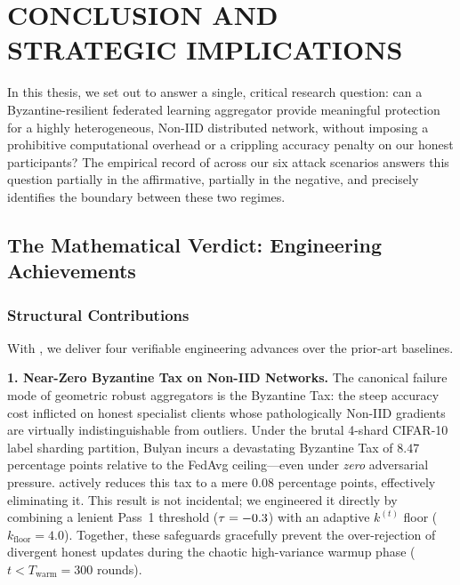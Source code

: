 \documentclass[../main.tex]{subfiles}
\begin{document}
\chapter{CONCLUSION AND STRATEGIC IMPLICATIONS}
\label{ch:conclusion}

In this thesis, we set out to answer a single, critical research question: can a Byzantine-resilient federated learning aggregator provide meaningful protection for a highly heterogeneous, Non-IID distributed network, without imposing a prohibitive computational overhead or a crippling accuracy penalty on our honest participants? The empirical record of \aegis{} across our six attack scenarios answers this question partially in the affirmative, partially in the negative, and precisely identifies the boundary between these two regimes.

\section{The Mathematical Verdict: Engineering Achievements}
\label{sec:conclusion_verdict}

\subsection{Structural Contributions}
\label{sec:conclusion_contributions}

With \aegis{}, we deliver four verifiable engineering advances over the prior-art baselines.

\textbf{1. Near-Zero Byzantine Tax on Non-IID Networks.}
The canonical failure mode of geometric robust aggregators is the Byzantine Tax: the steep accuracy cost inflicted on honest specialist clients whose pathologically Non-IID gradients are virtually indistinguishable from outliers. Under the brutal 4-shard CIFAR-10 label sharding partition, Bulyan incurs a devastating Byzantine Tax of $8.47$ percentage points relative to the FedAvg ceiling---even under \emph{zero} adversarial pressure. \aegis{} actively reduces this tax to a mere $0.08$ percentage points, effectively eliminating it. This result is not incidental; we engineered it directly by combining a lenient Pass~1 threshold ($\tau = -0.3$) with an adaptive $k^{(t)}$ floor ($k_{\text{floor}} = 4.0$). Together, these safeguards gracefully prevent the over-rejection of divergent honest updates during the chaotic high-variance warmup phase ($t < T_{\text{warm}} = 300$ rounds).
\end{document}
